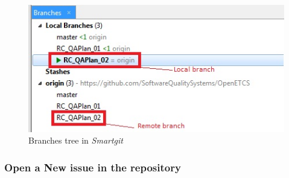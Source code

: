 \documentclass{template/openetcs_article}
\begin{document}
\begin{figure}
\centering
\includegraphics {./figures/Branches.JPG}
\caption{Branches tree in {\it Smartgit}}
\end{figure}


\subsubsection{Open a New issue in the repository}
\end{document}
